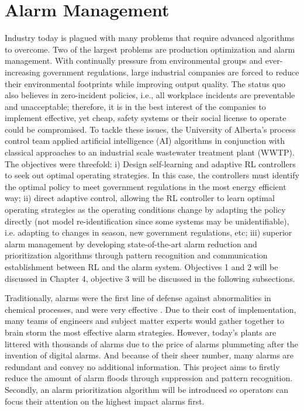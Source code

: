 \section{Alarm Management}
Industry today is plagued with many problems that require advanced algorithms to overcome. Two of the largest problems are production optimization and alarm management. With continually pressure from environmental groups and ever-increasing government regulations, large industrial companies are forced to reduce their environmental footprints while improving output quality. The status quo also believes in zero-incident policies, i.e., all workplace incidents are preventable and unacceptable; therefore, it is in the best interest of the companies to implement effective, yet cheap, safety systems or their social license to operate could be compromised. To tackle these issues, the University of Alberta's process control team applied artificial intelligence (AI) algorithms in conjunction with classical approaches to an industrial scale wastewater treatment plant (WWTP). The objectives were threefold: i) Design self-learning and adaptive RL controllers to seek out optimal operating strategies. In this case, the controllers must identify the optimal policy to meet government regulations in the most energy efficient way; ii) direct adaptive control, allowing the RL controller to learn optimal operating strategies as the operating conditions change by adapting the policy directly (not model re-identification since some systems may be unidentifiable), i.e. adapting to changes in season, new government regulations, etc; iii) superior alarm management by developing state-of-the-art alarm reduction and prioritization algorithms through pattern recognition and communication establishment between RL and the alarm system. Objectives 1 and 2 will be discussed in Chapter 4, objective 3 will be discussed in the following subsections.

Traditionally, alarms were the first line of defense against abnormalities in chemical processes, and were very effective \cite{alarm_manage}. Due to their cost of implementation, many teams of engineers and subject matter experts would gather together to brain storm the most effective alarm strategies. However, today's plants are littered with thousands of alarms due to the price of alarms plummeting after the invention of digital alarms. And because of their sheer number, many alarms are redundant and convey no additional information. 
This project aims to firstly reduce the amount of alarm floods through suppression and pattern recognition. Secondly, an alarm prioritization algorithm will be introduced so operators can focus their attention on the highest impact alarms first.

